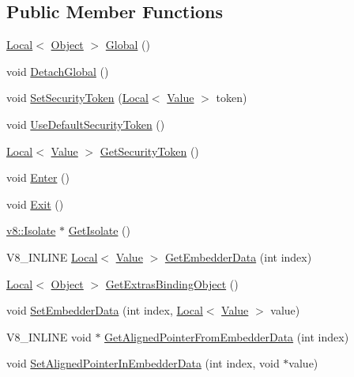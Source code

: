 \subsection*{Public Member Functions}
\begin{DoxyCompactItemize}
\item 
\hyperlink{classv8_1_1Local}{Local}$<$ \hyperlink{classv8_1_1Object}{Object} $>$ \hyperlink{classv8_1_1Context_af5cd9f97ef6a3307c1c21f80f4b743eb}{Global} ()
\item 
void \hyperlink{classv8_1_1Context_a841c7dd92eb8c57df92a268a164dea97}{Detach\+Global} ()
\item 
void \hyperlink{classv8_1_1Context_a2351d9bdf4450d5f23734033289ba3ab}{Set\+Security\+Token} (\hyperlink{classv8_1_1Local}{Local}$<$ \hyperlink{classv8_1_1Value}{Value} $>$ token)
\item 
void \hyperlink{classv8_1_1Context_aa9e1a14982b64fd51ab87600a287bad2}{Use\+Default\+Security\+Token} ()
\item 
\hyperlink{classv8_1_1Local}{Local}$<$ \hyperlink{classv8_1_1Value}{Value} $>$ \hyperlink{classv8_1_1Context_a59d7bc98684603ec4d9b1d1db2acaad8}{Get\+Security\+Token} ()
\item 
void \hyperlink{classv8_1_1Context_a6995c49d9897eb49053f07874b825133}{Enter} ()
\item 
void \hyperlink{classv8_1_1Context_a2db09d4fefb26023a40d88972a4c1599}{Exit} ()
\item 
\hyperlink{classv8_1_1Isolate}{v8\+::\+Isolate} $\ast$ \hyperlink{classv8_1_1Context_af55552d8658ecb20eff7af2c83e8ede2}{Get\+Isolate} ()
\item 
V8\+\_\+\+I\+N\+L\+I\+NE \hyperlink{classv8_1_1Local}{Local}$<$ \hyperlink{classv8_1_1Value}{Value} $>$ \hyperlink{classv8_1_1Context_a9cfafe0ac56f6aee17eb80a913489296}{Get\+Embedder\+Data} (int index)
\item 
\hyperlink{classv8_1_1Local}{Local}$<$ \hyperlink{classv8_1_1Object}{Object} $>$ \hyperlink{classv8_1_1Context_aa06026c0a9dc43874b437675b8fd0059}{Get\+Extras\+Binding\+Object} ()
\item 
void \hyperlink{classv8_1_1Context_a1f2f3da0b9c3d9b68a5384b757d607d2}{Set\+Embedder\+Data} (int index, \hyperlink{classv8_1_1Local}{Local}$<$ \hyperlink{classv8_1_1Value}{Value} $>$ value)
\item 
V8\+\_\+\+I\+N\+L\+I\+NE void $\ast$ \hyperlink{classv8_1_1Context_aa3b5c1a1a5d145c6096840898013f559}{Get\+Aligned\+Pointer\+From\+Embedder\+Data} (int index)
\item 
void \hyperlink{classv8_1_1Context_a522063c88e4c2832f5ff4f3980815f58}{Set\+Aligned\+Pointer\+In\+Embedder\+Data} (int index, void $\ast$value)

\end{DoxyCompactItemize}
